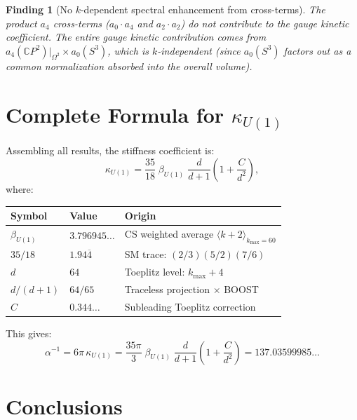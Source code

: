 \documentclass[12pt,a4paper]{article}
\newtheorem{finding}{Finding}
\theoremstyle{definition}
\theoremstyle{remark}
\begin{document}
\begin{finding}[No $k$-dependent spectral enhancement from cross-terms]
The product $a_4$ cross-terms ($a_0 \cdot a_4$ and $a_2 \cdot a_2$)
do not contribute to the gauge kinetic coefficient.  The entire gauge
kinetic contribution comes from $a_4(\mathbb{C}P^2)|_{\Omega^2} \times
a_0(S^3)$, which is $k$-independent (since $a_0(S^3)$ factors out as
a common normalization absorbed into the overall volume).
\end{finding}

\section{Complete Formula for $\kappa_{U(1)}$}
\label{sec:formula}

Assembling all results, the stiffness coefficient is:
\begin{equation}
\boxed{
\kappa_{U(1)} = \frac{35}{18}\;\beta_{U(1)}\;\frac{d}{d+1}
\left(1 + \frac{C}{d^2}\right),
}
\end{equation}
where:
\begin{center}
\renewcommand{\arraystretch}{1.4}
\begin{tabular}{lll}
\toprule
\textbf{Symbol} & \textbf{Value} & \textbf{Origin} \\
\midrule
$\beta_{U(1)}$ & $3.796945\ldots$ & CS weighted average
  $\langle k+2 \rangle_{k_{\max}=60}$ \\
$35/18$ & $1.94\overline{4}$ & SM trace:
  $(2/3)(5/2)(7/6)$ \\
$d$ & $64$ & Toeplitz level:
  $k_{\max} + 4$ \\
$d/(d+1)$ & $64/65$ & Traceless projection $\times$ BOOST \\
$C$ & $0.344\ldots$ & Subleading Toeplitz correction \\
\bottomrule
\end{tabular}
\end{center}

\medskip\noindent
This gives:
\begin{equation}
\alpha^{-1} = 6\pi\,\kappa_{U(1)}
= \frac{35\pi}{3}\;\beta_{U(1)}\;\frac{d}{d+1}
\left(1 + \frac{C}{d^2}\right)
= 137.03599985\ldots
\end{equation}

\section{Conclusions}
\label{sec:conclusions}
\end{document}
